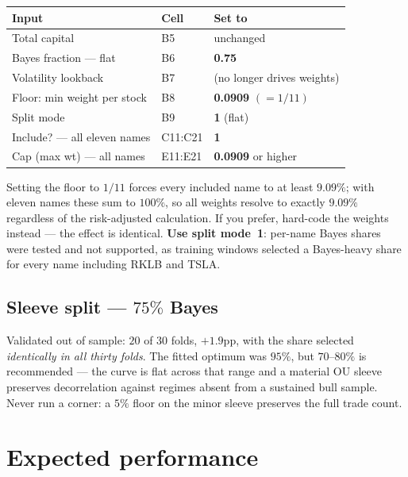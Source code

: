 \documentclass[11pt]{article}
\begin{document}
\begin{table}[H]\centering\small
\renewcommand{\arraystretch}{1.15}
\begin{tabular}{l l l}
\toprule
\textbf{Input} & \textbf{Cell} & \textbf{Set to}\\
\midrule
Total capital & B5 & unchanged\\
Bayes fraction --- flat & B6 & \textbf{0.75}\\
Volatility lookback & B7 & (no longer drives weights)\\
\rowcolor{bcact} Floor: min weight per stock & B8 & \textbf{0.0909} \quad$(=1/11)$\\
Split mode & B9 & \textbf{1} (flat)\\
Include? --- all eleven names & C11:C21 & \textbf{1}\\
Cap (max wt) --- all names & E11:E21 & \textbf{0.0909} or higher\\
\bottomrule
\end{tabular}
\end{table}

Setting the floor to $1/11$ forces every included name to at least $9.09\%$; with eleven names
these sum to $100\%$, so all weights resolve to exactly $9.09\%$ regardless of the
risk-adjusted calculation. If you prefer, hard-code the weights instead --- the effect is
identical. \textbf{Use split mode~1}: per-name Bayes shares were tested and not supported, as
training windows selected a Bayes-heavy share for every name including RKLB and TSLA.

\subsection{Sleeve split --- $75\%$ Bayes}

Validated out of sample: $20$ of $30$ folds, $+1.9$pp, with the share selected \emph{identically
in all thirty folds}. The fitted optimum was $95\%$, but $70\text{--}80\%$ is recommended --- the
curve is flat across that range and a material OU sleeve preserves decorrelation against regimes
absent from a sustained bull sample. Never run a corner: a $5\%$ floor on the minor sleeve
preserves the full trade count.

\section{Expected performance}
\end{document}
